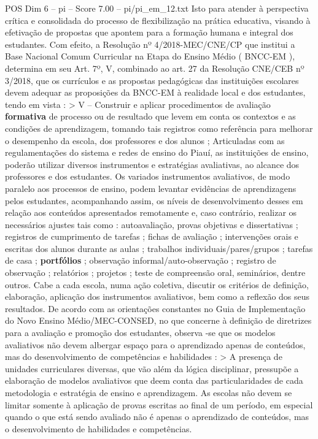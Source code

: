 \begin{textsample}{POS Dim 6 – pi – Score 7.00 – pi/pi\_em\_12.txt}
Isto para atender à perspectiva crítica e consolidada do processo de flexibilização na prática educativa, visando à efetivação de propostas que apontem para a formação humana e integral dos estudantes.
Com efeito, a Resolução nº 4/2018-MEC/CNE/CP que institui a Base Nacional Comum Curricular na Etapa do Ensino Médio ( BNCC-EM ), determina em seu Art. 7º, V, combinado ao art. 27 da Resolução CNE/CEB nº 3/2018, que os currículos e as propostas pedagógicas das instituições escolares devem adequar as proposições da BNCC-EM à realidade local e dos estudantes, tendo em vista : > V – Construir e aplicar procedimentos de avaliação \textbf{formativa} de processo ou de resultado que levem em conta os contextos e as condições de aprendizagem, tomando tais registros como referência para melhorar o desempenho da escola, dos professores e dos alunos ; Articuladas com as regulamentações do sistema e redes de ensino do Piauí, as instituições de ensino, poderão utilizar diversos instrumentos e estratégias avaliativas, ao alcance dos professores e dos estudantes.
Os variados instrumentos avaliativos, de modo paralelo aos processos de ensino, podem levantar evidências de aprendizagens pelos estudantes, acompanhando assim, os níveis de desenvolvimento desses em relação aos conteúdos apresentados remotamente e, caso contrário, realizar os necessários ajustes tais como : autoavaliação, provas objetivas e dissertativas ; registros de cumprimento de tarefas ; fichas de avaliação ; intervenções orais e escritas dos alunos durante as aulas ; trabalhos individuais/pares/grupos ; tarefas de casa ; \textbf{portfólios} ; observação informal/auto-observação ; registro de observação ; relatórios ; projetos ; teste de compreensão oral, seminários, dentre outros.
Cabe a cada escola, numa ação coletiva, discutir os critérios de definição, elaboração, aplicação dos instrumentos avaliativos, bem como a reflexão dos seus resultados.
De acordo com as orientações constantes no Guia de Implementação do Novo Ensino Médio/MEC-CONSED, no que concerne à definição de diretrizes para a avaliação e promoção dos estudantes, observa -se que os modelos avaliativos não devem albergar espaço para o aprendizado apenas de conteúdos, mas do desenvolvimento de competências e habilidades : > A presença de unidades curriculares diversas, que vão além da lógica disciplinar, pressupõe a elaboração de modelos avaliativos que deem conta das particularidades de cada metodologia e estratégia de ensino e aprendizagem.
As escolas não devem se limitar somente à aplicação de provas escritas ao final de um período, em especial quando o que está sendo avaliado não é apenas o aprendizado de conteúdos, mas o desenvolvimento de habilidades e competências.

\end{textsample}
